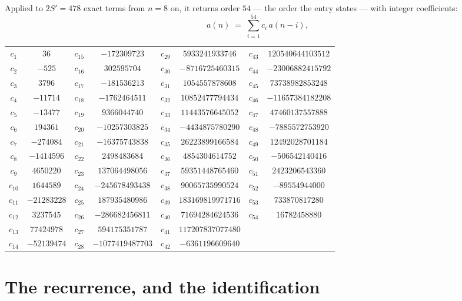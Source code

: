 \documentclass[11pt,a4paper]{article}
\theoremstyle{plain}
\theoremstyle{definition}
\begin{document}
Applied to $2S'=478$ exact terms from $n=8$ on, it returns order $54$ --- the
order the entry states --- with integer coefficients:
\[
a(n)\;=\;\sum_{i=1}^{54}c_i\,a(n-i),
\]
\begin{center}\small
\begin{tabular}{cccccccc}
$c_{1}$ & $36$ & $c_{15}$ & $-172309723$ & $c_{29}$ & $5933241933746$ & $c_{43}$ & $120540644103512$ \\
$c_{2}$ & $-525$ & $c_{16}$ & $302595704$ & $c_{30}$ & $-8716725460315$ & $c_{44}$ & $-23006882415792$ \\
$c_{3}$ & $3796$ & $c_{17}$ & $-181536213$ & $c_{31}$ & $1054557878608$ & $c_{45}$ & $73738982853248$ \\
$c_{4}$ & $-11714$ & $c_{18}$ & $-1762464511$ & $c_{32}$ & $10852477794434$ & $c_{46}$ & $-11657384182208$ \\
$c_{5}$ & $-13477$ & $c_{19}$ & $9366044740$ & $c_{33}$ & $11443576645052$ & $c_{47}$ & $47460137557888$ \\
$c_{6}$ & $194361$ & $c_{20}$ & $-10257303825$ & $c_{34}$ & $-4434875780290$ & $c_{48}$ & $-7885572753920$ \\
$c_{7}$ & $-274084$ & $c_{21}$ & $-16375743838$ & $c_{35}$ & $26223899166584$ & $c_{49}$ & $12492028701184$ \\
$c_{8}$ & $-1414596$ & $c_{22}$ & $2498483684$ & $c_{36}$ & $4854304614752$ & $c_{50}$ & $-506542140416$ \\
$c_{9}$ & $4650220$ & $c_{23}$ & $137064498056$ & $c_{37}$ & $59351448765460$ & $c_{51}$ & $2423206543360$ \\
$c_{10}$ & $1644589$ & $c_{24}$ & $-245678493438$ & $c_{38}$ & $90065735990524$ & $c_{52}$ & $-89554944000$ \\
$c_{11}$ & $-21283228$ & $c_{25}$ & $187935480986$ & $c_{39}$ & $183169819971716$ & $c_{53}$ & $733870817280$ \\
$c_{12}$ & $3237545$ & $c_{26}$ & $-286682456811$ & $c_{40}$ & $71694284624536$ & $c_{54}$ & $16782458880$ \\
$c_{13}$ & $77424978$ & $c_{27}$ & $594175351787$ & $c_{41}$ & $117207837077480$ &  &  \\
$c_{14}$ & $-52139474$ & $c_{28}$ & $-1077419487703$ & $c_{42}$ & $-6361196609640$ &  &  \\
\end{tabular}
\end{center}

\section{The recurrence, and the identification}
\end{document}
